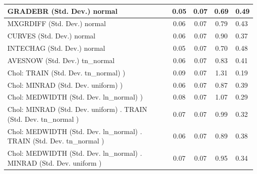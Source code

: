 \begin{table}
\begin{center}
\begin{tabular}{|l|l|c|c|c|l|}
			\hline
			GRADEBR (Std. Dev.) normal &  & 0.05 & 0.07 & 0.69 & 0.49 \\
			\hline
			MXGRDIFF (Std. Dev.) normal &  & 0.06 & 0.07 & 0.79 & 0.43 \\
			\hline
			CURVES (Std. Dev.) normal &  & 0.06 & 0.07 & 0.90 & 0.37 \\
			\hline
			INTECHAG (Std. Dev.) normal &  & 0.05 & 0.07 & 0.70 & 0.48 \\
			\hline
			AVESNOW (Std. Dev.) tn_normal &  & 0.06 & 0.07 & 0.83 & 0.41 \\
			\hline
			 Chol: TRAIN (Std. Dev. tn_normal) ) &  & 0.09 & 0.07 & 1.31 & 0.19 \\
			\hline
			 Chol: MINRAD (Std. Dev. uniform) ) &  & 0.06 & 0.07 & 0.87 & 0.39 \\
			\hline
			 Chol: MEDWIDTH (Std. Dev. ln_normal) ) &  & 0.08 & 0.07 & 1.07 & 0.29 \\
			\hline
			 Chol: MINRAD (Std. Dev. uniform) . TRAIN (Std. Dev.   tn_normal ) &  & 0.07 & 0.07 & 0.99 & 0.32 \\
			\hline
			 Chol: MEDWIDTH (Std. Dev. ln_normal) . TRAIN (Std. Dev.   tn_normal ) &  & 0.06 & 0.07 & 0.89 & 0.38 \\
			\hline
			 Chol: MEDWIDTH (Std. Dev. ln_normal) . MINRAD (Std. Dev.   uniform ) &  & 0.07 & 0.07 & 0.95 & 0.34 \\
			\hline
		\end{tabular}
	\end{center}
\end{table}